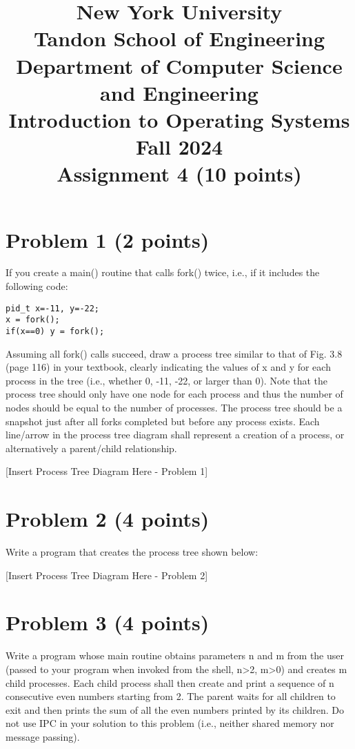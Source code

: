 \documentclass{article}
\begin{document}
\title{New York University \\ Tandon School of Engineering \\ Department of Computer Science and Engineering \\ Introduction to Operating Systems \\ Fall 2024 \\ Assignment 4 (10 points)}
\date{}
\maketitle

\section*{Problem 1 (2 points)}

If you create a main() routine that calls fork() twice, i.e., if it includes the following code:

\begin{verbatim}
pid_t x=-11, y=-22;
x = fork();
if(x==0) y = fork();
\end{verbatim}

Assuming all fork() calls succeed, draw a process tree similar to that of Fig. 3.8 (page 116) in your textbook, clearly indicating the values of x and y for each process in the tree (i.e., whether 0, -11, -22, or larger than 0). Note that the process tree should only have one node for each process and thus the number of nodes should be equal to the number of processes. The process tree should be a snapshot just after all forks completed but before any process exists. Each line/arrow in the process tree diagram shall represent a creation of a process, or alternatively a parent/child relationship.

[Insert Process Tree Diagram Here - Problem 1]


\section*{Problem 2 (4 points)}

Write a program that creates the process tree shown below:

[Insert Process Tree Diagram Here - Problem 2]


\section*{Problem 3 (4 points)}

Write a program whose main routine obtains parameters n and m from the user (passed to your program when invoked from the shell, n>2, m>0) and creates m child processes. Each child process shall then create and print a sequence of n consecutive even numbers starting from 2. The parent waits for all children to exit and then prints the sum of all the even numbers printed by its children. Do not use IPC in your solution to this problem (i.e., neither shared memory nor message passing).
\end{document}

